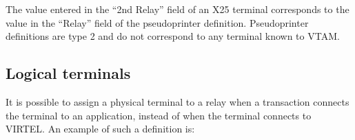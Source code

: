 \documentclass[letterpaper,10pt,english]{sphinxmanual}
\begin{document}
\sphinxAtStartPar
The value entered in the “2nd Relay” field of an X25 terminal corresponds to the value in the “Relay” field of the pseudo\sphinxhyphen{}printer definition. Pseudo\sphinxhyphen{}printer definitions are type 2 and do not correspond to any terminal known to VTAM.

\ignorespaces 

\subsection{Logical terminals}
\label{\detokenize{connectivity_guide:logical-terminals}}\label{\detokenize{connectivity_guide:index-148}}
\sphinxAtStartPar
It is possible to assign a physical terminal to a relay when a transaction connects the terminal to an application, instead of when the terminal connects to VIRTEL. An example of such a definition is:

\begin{sphinxVerbatim}[commandchars=\\\{\}]
  

                 

                     
\end{sphinxVerbatim}

\begin{sphinxVerbatim}[commandchars=\\\{\}]
      

                 

                 
                 
                 
\end{sphinxVerbatim}
\end{document}
